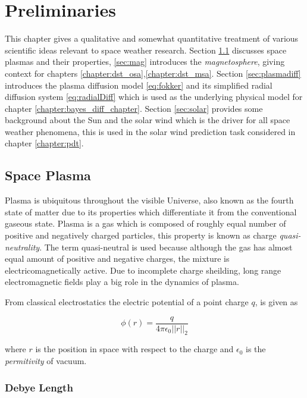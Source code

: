 \chapter{Preliminaries}\label{chapter:preliminaries}

This chapter gives a qualitative and somewhat quantitative treatment of various scientific ideas 
relevant to space weather research. Section \ref{sec:plasma} discusses space plasmas and their properties, 
\ref{sec:mag} introduces the \emph{magnetosphere}, giving context for chapters \ref{chapter:dst_osa},\ref{chapter:dst_msa}. 
Section \ref{sec:plasmadiff} introduces the plasma diffusion model \ref{eq:fokker} and its simplified 
radial diffusion system \ref{eq:radialDiff} which is used as the underlying physical model for chapter 
\ref{chapter:bayes_diff_chapter}. Section \ref{sec:solar} provides some background about the Sun and 
the solar wind which is the driver for all space weather phenomena, this is used in the solar wind prediction 
task considered in chapter \ref{chapter:pdt}.    

\section{Space Plasma}\label{sec:plasma}

Plasma is ubiquitous throughout the visible Universe, also known as the fourth state of matter 
due to its properties which differentiate it from the conventional gaseous state. Plasma is a 
gas which is composed of roughly equal number of positive and negatively charged particles, this
property is known as charge \emph{quasi-neutrality}. The term quasi-neutral is used because although
the gas has almost equal amount of positive and negative charges, the mixture is electricomagnetically 
active. Due to incomplete charge sheilding, long range electromagnetic fields play a big role in the 
dynamics of plasma.

From classical electrostatics the electric potential of a point charge $q$, is given as

\begin{equation}
    \phi(r) = \frac{q}{4\pi\epsilon_0 ||r||_2}
\end{equation}

where $r$ is the position in space with respect to the charge and $\epsilon_0$ is the \emph{permitivity} of vacuum.

\subsection*{Debye Length}


